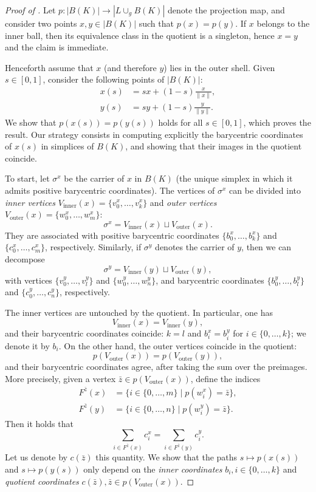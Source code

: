 \documentclass[a4paper,english,cleveref,autoref,thm-restate,nolineno]{socg-lipics-v2021}
\newcommand{\geomreal}[1] { |#1| } %
\begin{document}
\begin{proof}[Proof of ]
	\label{proof:raydescendstoquotient}
	Let $p\colon\geomreal{B(K)}\to\geomreal{L\cup_g B(K)}$ denote the projection map, and consider two points $x,y\in\geomreal{B(K)}$ such that $p(x)=p(y)$.
	If $x$ belongs to the inner ball, then its equivalence class in the quotient is a singleton, hence $x=y$ and the claim is immediate.
		
	Henceforth assume that $x$ (and therefore $y$) lies in the outer shell.
	Given $s\in[0,1]$, consider the following points of $\geomreal{B(K)}$:
	\begin{align*}
		x(s) &= s x + (1-s) \frac{x}{\|x\|},\\
		y(s) &= s y + (1-s) \frac{y}{\|y\|}.
	\end{align*}
	We show that $p(x(s)) = p(y(s))$ holds for all $s\in[0,1]$, which proves the result.
	Our strategy consists in computing explicitly the barycentric coordinates of $x(s)$ in simplices of $B(K)$, and showing that their images in the quotient coincide.
	

	To start, let $\sigma^x$ be the carrier of $x$ in $B(K)$ (the unique simplex in which it admits positive barycentric coordinates).
	The vertices of $\sigma^x$ can be divided into \textit{inner vertices} $V_\mathrm{inner}(x) = \{v_0^x,\dots,v_k^x\}$ and \textit{outer vertices} $V_\mathrm{outer}(x) = \{w_0^x,\dots,w_m^x\}$:
	\[
	\sigma^x = V_\mathrm{inner}(x)\sqcup V_\mathrm{outer}(x).
	\]
	They are associated with positive barycentric coordinates $\{b_0^x,\dots,b_k^x\}$ and $\{c_0^x,\dots,c_m^x\}$, respectively.
	Similarly, if $\sigma^y$ denotes the carrier of $y$, then we can decompose
	\[
	\sigma^y = V_\mathrm{inner}(y)\sqcup V_\mathrm{outer}(y),
	\]
	with vertices $\{v_0^y,\dots,v_l^y\}$ and $\{w_0^y,\dots,w_n^y\}$, and barycentric coordinates $\{b_0^y,\dots,b_l^y\}$ and $\{c_0^y,\dots,c_n^y\}$, respectively.
	
	The inner vertices are untouched by the quotient. In particular, one has
	\[
	V_\mathrm{inner}(x) = V_\mathrm{inner}(y),
	\]
	and their barycentric coordinates coincide: $k=l$ and $b_i^x=b_i^y$ for $i\in\{0,\dots,k\}$; we denote it by $b_i$.
	On the other hand, the outer vertices coincide in the quotient:
	\[
	p(V_\mathrm{outer}(x)) = p(V_\mathrm{outer}(y)),
	\]
	and their barycentric coordinates agree, after taking the sum over the preimages.
	More precisely, given a vertex $\bar z \in p(V_\mathrm{outer}(x))$, define the indices 
	\begin{align*}
		F^{\bar z}(x) &= \{i \in \{0,\dots,m\}\mid p(w_i^x) = \bar z \},\\
		F^{\bar z}(y) &= \{i \in \{0,\dots,n\}\mid p(w_i^y) = \bar z \}.
	\end{align*}
	Then it holds that
	\[
	\sum_{i \in F^{\bar z}(x)} c_i^x = \sum_{i \in F^{\bar z}(y)} c_i^y.
	\]
	Let us denote by $c(\bar z)$ this quantity.
	We show that the paths $s\mapsto p(x(s))$ and $s\mapsto p(y(s))$ only depend on the \textit{inner coordinates} $b_i, i\in\{0,\dots,k\}$ and \textit{quotient coordinates} $c(\bar z), \bar z \in p(V_\mathrm{outer}(x))$.


\end{proof}
\end{document}
